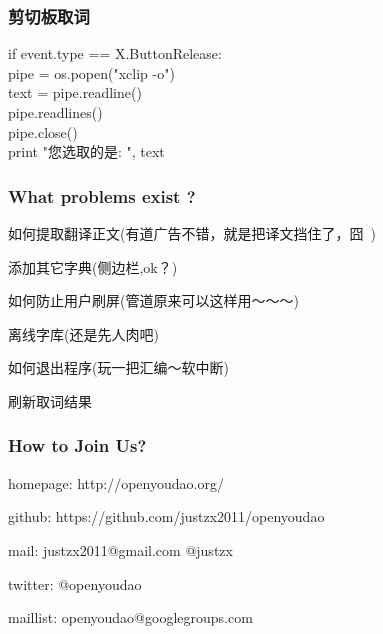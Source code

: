 \documentclass[10pt]{beamer}
\begin{document}
\begin{CJK*}{UTF8}{song}
\begin{frame}
   \frametitle{剪切板取词}
if event.type == X.ButtonRelease: \\
    pipe = os.popen("xclip -o") \\
    text = pipe.readline() \\
    pipe.readlines() \\
    pipe.close() \\
    print "您选取的是: ", text \\
\end{frame}
\begin{frame}
  \frametitle{\Large{What problems exist ?}}
\begin{itemize}
{ 
  \item 如何提取翻译正文(有道广告不错，就是把译文挡住了，囧~) 
  \item 添加其它字典(侧边栏,ok？)
  \item 如何防止用户刷屏(管道原来可以这样用～～～)
  \item 离线字库(还是先人肉吧)
  \item 如何退出程序(玩一把汇编～软中断) 
  \item 刷新取词结果
}
\end{itemize}

\end{frame}

\begin{frame}
  \frametitle{How to Join Us?}

\begin{itemize}
\Large{
  \item homepage: http://openyoudao.org/
  \item github:
   https://github.com/justzx2011/openyoudao
  \item mail: justzx2011@gmail.com  @justzx
  \item twitter: @openyoudao
  \item maillist: openyoudao@googlegroups.com
}
  
\end{itemize}

\end{frame}

\end{CJK*}
\end{document}
